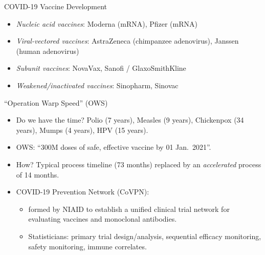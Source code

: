 \documentclass{beamer}
\begin{document}
\begin{frame}[c]{COVID-19 Vaccine Development}

\begin{center}
\begin{itemize}
  \itemsep10pt
  \item \textit{Nucleic acid vaccines}: Moderna (mRNA), Pfizer (mRNA)
  \item \textit{Viral-vectored vaccines}: AstraZeneca (chimpanzee adenovirus),
     Janssen (human adenovirus)
  \item \textit{Subunit vaccines}: NovaVax, Sanofi / GlaxoSmithKline
  \item \textit{Weakened/inactivated vaccines}: Sinopharm, Sinovac
\end{itemize}
\end{center}


\end{frame}


\begin{frame}[c]{``Operation Warp Speed'' (OWS)}

\begin{center}
\begin{itemize}
  \itemsep10pt
  \item Do we have the time? Polio (7 years), Measles (9 years), Chickenpox (34
     years), Mumps (4 years), HPV (15 years).
  \item OWS: ``300M doses of safe, effective vaccine by 01 Jan.~2021''.
  \item How? Typical process timeline (73 months) replaced by an
      \textit{accelerated} process of 14 months.
  \item COVID-19 Prevention Network (CoVPN):
      \begin{itemize}
          \item formed by NIAID to establish a unified clinical trial network
              for evaluating vaccines and monoclonal antibodies.
          \item Statisticians: primary trial design/analysis,
          sequential efficacy monitoring, safety monitoring, immune correlates.
      \end{itemize}
\end{itemize}
\end{center}

\note{
}

\end{frame}
\end{document}
